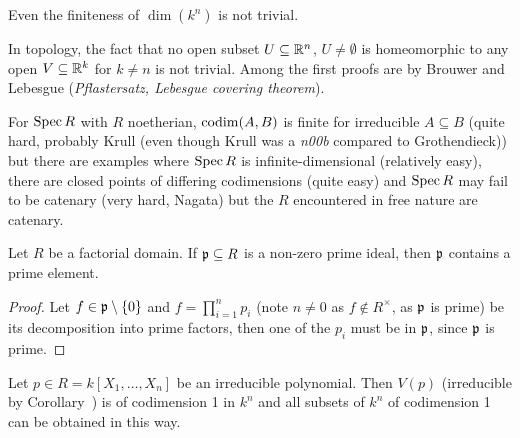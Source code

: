 \documentclass[a4paper,parskip=half,numbers=enddot, DIV=12]{scrreprt}
\begin{document}
	\begin{rem*}
		\begin{alphanumerate}
			\item Even the finiteness of $\dim(k^n)$ is not trivial. 
			\item In topology, the fact that no open subset $U\subseteq \mathbb{R}^n$, $U\neq \emptyset$ is homeomorphic to any open $V\subseteq \mathbb{R}^k$ for $k\neq n$ is not trivial. Among the first proofs are by Brouwer and Lebesgue (\emph{Pflastersatz, Lebesgue covering theorem}).
			\item For $\operatorname{Spec} R$ with $R$ noetherian, $\operatorname{codim}(A,B)$ is finite for irreducible $A\subseteq B$ (quite hard, probably Krull (even though Krull was a \emph{n00b} compared to Grothendieck)) but there are examples where $\operatorname{Spec} R$ is infinite-dimensional (relatively easy), there are closed points of differing codimensions (quite easy) and $\operatorname{Spec} R$ may fail to be catenary (very hard, Nagata) but the $R$ encountered in free nature are catenary.
		\end{alphanumerate}
		
	\end{rem*}
	\begin{lem}
		Let $R$ be a factorial domain. If $\mathfrak{p}\subseteq R$ is a non-zero prime ideal, then $\mathfrak{p}$ contains a prime element.
	\end{lem}
	\begin{proof}
		Let $f\in \mathfrak{p} \setminus \{0\}$ and $f = \prod_{i=1}^n p_i$ (note $n\neq 0$ as $f\not \in R^\times$, as $\mathfrak{p}$ is prime) be its decomposition into prime factors, then one of the $p_i$ must be in $\mathfrak{p}$, since $\mathfrak{p}$ is prime.
	\end{proof}
	\begin{prop}
		Let $p\in R=k[X_1,\ldots, X_n]$ be an irreducible polynomial. Then $V(p)$ (irreducible by Corollary~) is of codimension 1 in $k^n$ and all subsets of $k^n$ of codimension 1 can be obtained in this way.
	\end{prop}
\end{document}

